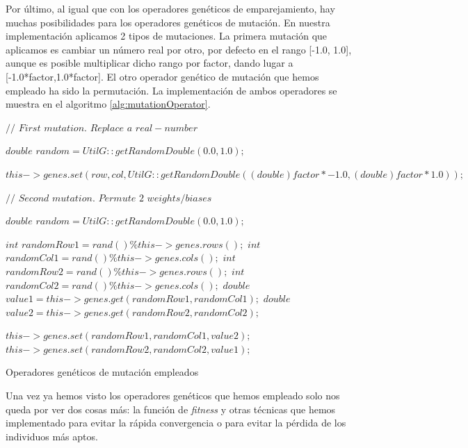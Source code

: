 Por último, al igual que con los operadores genéticos de emparejamiento, hay muchas posibilidades para los operadores genéticos de mutación. En nuestra implementación aplicamos 2 tipos de mutaciones. La primera mutación que aplicamos es cambiar un número real por otro, por defecto en el rango [-1.0, 1.0], aunque es posible multiplicar dicho rango por factor, dando lugar a [-1.0*factor,1.0*factor]. El otro operador genético de mutación que hemos empleado ha sido la permutación. La implementación de ambos operadores se muestra en el algoritmo \ref{alg:mutationOperator}.

\vspace{2mm}
\begin{algorithm}[H]
    
    $//$ $First$ $mutation.$ $Replace$ $a$ $real-number$
    
    {
        {
            $double$ $random = UtilG::getRandomDouble(0.0, 1.0);$

			{
				$this->genes.set(row, col, UtilG::getRandomDouble((double)factor * -1.0, (double)factor * 1.0));$
			}
        }
    }
    
    $//$ $Second$ $mutation.$ $Permute$ $2$ $weights/biases$
    
    {
        {
            $double$ $random = UtilG::getRandomDouble(0.0, 1.0);$

			{
                $int$ $randomRow1 = rand() \% this->genes.rows();$
                $int$ $randomCol1 = rand() \% this->genes.cols();$
                $int$ $randomRow2 = rand() \% this->genes.rows();$
                $int$ $randomCol2 = rand() \% this->genes.cols();$
                $double$ $value1 = this->genes.get(randomRow1, randomCol1);$
                $double$ $value2 = this->genes.get(randomRow2, randomCol2);$

                $this->genes.set(randomRow1, randomCol1, value2);$
                $this->genes.set(randomRow2, randomCol2, value1);$
			}
        }
    }
    
	\caption{Operadores genéticos de mutación empleados}
	\label{alg:mutationOperator}
\end{algorithm}

\newpage
Una vez ya hemos visto los operadores genéticos que hemos empleado solo nos queda por ver dos cosas más: la función de \textit{fitness} y otras técnicas que hemos implementado para evitar la rápida convergencia o para evitar la pérdida de los individuos más aptos.

